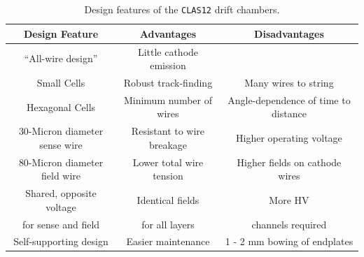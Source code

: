 \begin{table}[ht]
\begin{center}
\begin{tabular} {||c|c|c||} \hline \hline
{\bf Design Feature  }       &{\bf Advantages} &{\bf Disadvantages}\\ \hline
``All-wire design'' & Little cathode emission & \\ \hline
Small Cells & Robust track-finding  & Many wires to string \\ \hline
Hexagonal Cells & Minimum number of wires  & Angle-dependence of time to distance  \\ \hline
30-Micron diameter sense wire & Resistant to wire breakage & Higher operating voltage \\ \hline
80-Micron diameter field wire & Lower total wire tension & Higher fields on cathode wires \\ \hline
Shared, opposite voltage  & Identical fields & More HV \\
for sense and field & for all layers & channels required \\ \hline
Self-supporting design & Easier maintenance & 1 - 2 mm bowing of endplates \\ \hline
\end{tabular}
\caption{\small{Design features of the {\tt CLAS12} drift chambers.}}
\label{fwd-dc-design-features}
\end{center}
\end{table}

